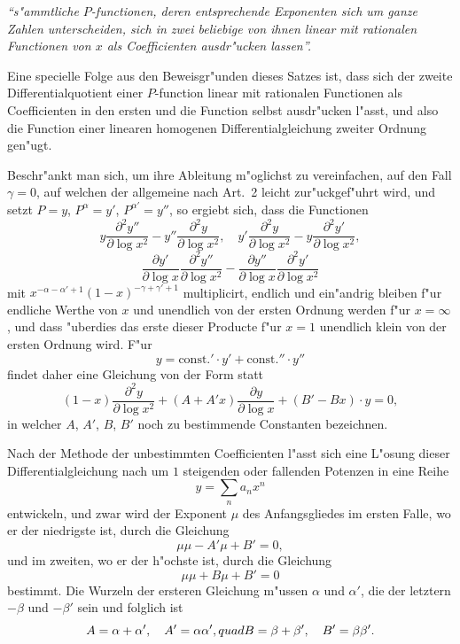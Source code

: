 \documentclass[12pt,a4paper]{book}
\theoremstyle{definition}
\theoremstyle{remark}
\begin{document}
\medskip
\textit{``s{"a}mmtliche $P$-functionen, deren entsprechende Exponenten sich um ganze Zahlen unterscheiden, sich in zwei beliebige von ihnen linear mit rationalen Functionen von $x$ als Coefficienten ausdr{"u}cken lassen''.}
\medskip

Eine specielle Folge aus den Beweisgr{"u}nden dieses Satzes ist, dass sich der zweite Differentialquotient einer $P$-function linear mit rationalen Functionen als Coefficienten in den ersten und die Function selbst ausdr{"u}cken l{"a}sst, und also die Function einer linearen homogenen Differentialgleichung zweiter Ordnung gen{"u}gt.

Beschr{"a}nkt man sich, um ihre Ableitung m{"o}glichst zu vereinfachen, auf den Fall $\gamma = 0$, auf welchen der allgemeine nach Art.~2 leicht zur{"u}ckgef{"u}hrt wird, und setzt $P = y$, $P^{\alpha} = y'$, $P^{\alpha'} = y''$, so ergiebt sich, dass die Functionen
\[
y \frac{\partial^2 y''}{\partial \log x^2} - y'' \frac{\partial^2 y}{\partial \log x^2}, \quad
y' \frac{\partial^2 y}{\partial \log x^2} - y \frac{\partial^2 y'}{\partial \log x^2},
\]
\[
\frac{\partial y'}{\partial \log x} \frac{\partial^2 y''}{\partial \log x^2} - \frac{\partial y''}{\partial \log x} \frac{\partial^2 y'}{\partial \log x^2}
\]
mit $x^{-\alpha-\alpha'+1} (1-x)^{-\gamma+\gamma'+1}$ multiplicirt, endlich und ein{"a}ndrig bleiben f{"u}r endliche Werthe von $x$ und unendlich von der ersten Ordnung werden f{"u}r $x = \infty$, und dass {"u}berdies das erste dieser Producte f{"u}r $x = 1$ unendlich klein von der ersten Ordnung wird. F{"u}r
\[
y = \text{const.}' \cdot y' + \text{const.}'' \cdot y''
\]
findet daher eine Gleichung von der Form statt
\[
(1-x) \frac{\partial^2 y}{\partial \log x^2} + (A + A'x) \frac{\partial y}{\partial \log x} + (B' - Bx) \cdot y = 0,
\]
in welcher $A$, $A'$, $B$, $B'$ noch zu bestimmende Constanten bezeichnen.

Nach der Methode der unbestimmten Coefficienten l{"a}sst sich eine L{"o}sung dieser Differentialgleichung nach um $1$ steigenden oder fallenden Potenzen in eine Reihe
\[
y = \sum_n a_n x^n
\]
entwickeln, und zwar wird der Exponent $\mu$ des Anfangsgliedes im ersten Falle, wo er der niedrigste ist, durch die Gleichung
\[
\mu\mu - A'\mu + B' = 0,
\]
und im zweiten, wo er der h{"o}chste ist, durch die Gleichung
\[
\mu\mu + B\mu + B' = 0
\]
bestimmt. Die Wurzeln der ersteren Gleichung m{"u}ssen $\alpha$ und $\alpha'$, die der letztern $-\beta$ und $-\beta'$ sein und folglich ist
\[
A = \alpha + \alpha', \quad A' = \alpha\alpha', \\quad B = \beta + \beta', \quad B' = \beta\beta'.
\]
\end{document}
